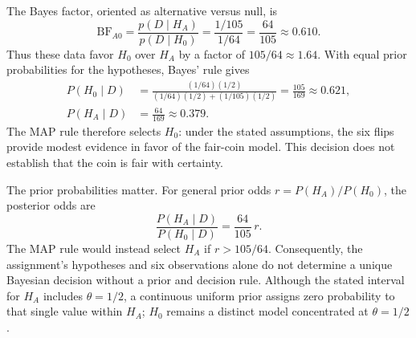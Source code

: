 \documentclass[11pt,letterpaper]{article}
\begin{document}
The Bayes factor, oriented as alternative versus null, is
\[
  \mathrm{BF}_{A0}
  =\frac{p(D\mid H_A)}{p(D\mid H_0)}
  =\frac{1/105}{1/64}
  =\frac{64}{105}\approx0.610.
\]
Thus these data favor $H_0$ over $H_A$ by a factor of $105/64\approx1.64$.
With equal prior probabilities for the hypotheses, Bayes' rule gives
\begin{align*}
  P(H_0\mid D)
    &=\frac{(1/64)(1/2)}{(1/64)(1/2)+(1/105)(1/2)}
     =\frac{105}{169}\approx0.621, \\
  P(H_A\mid D)
    &=\frac{64}{169}\approx0.379.
\end{align*}
The MAP rule therefore selects $H_0$: under the stated assumptions, the six
flips provide modest evidence in favor of the fair-coin model. This decision
does not establish that the coin is fair with certainty.

The prior probabilities matter. For general prior odds
$r=P(H_A)/P(H_0)$, the posterior odds are
\[
  \frac{P(H_A\mid D)}{P(H_0\mid D)}=\frac{64}{105}\,r.
\]
The MAP rule would instead select $H_A$ if $r>105/64$. Consequently, the
assignment's hypotheses and six observations alone do not determine a unique
Bayesian decision without a prior and decision rule. Although the stated
interval for $H_A$ includes $\theta=1/2$, a continuous uniform prior assigns
zero probability to that single value within $H_A$; $H_0$ remains a distinct
model concentrated at $\theta=1/2$.
\end{document}
